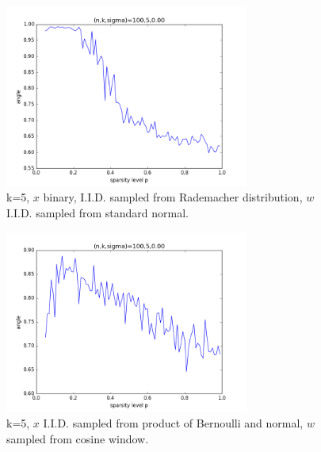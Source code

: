 \documentclass[letter, 10pt]{article}
\numberwithin{equation}{section}
\begin{document}
\begin{figure}
\centering 
\label{fig:10}
\includegraphics[width=8cm,keepaspectratio]{fig/w_norm_x_binary_n100_k5_p__sigma0_00.png}
\caption{k=5, $x$ binary, I.I.D. sampled from Rademacher distribution, $w$ I.I.D. sampled from standard normal.}
\end{figure}
\begin{figure}
\centering 
\label{fig:11}
\includegraphics[width=8cm,keepaspectratio]{fig/w_cos_x_BerNorm_n100_k5_p__sigma0_00.png}
\caption{k=5, $x$ I.I.D. sampled from product of Bernoulli and normal, $w$ sampled from cosine window.}
\end{figure}
\end{document}

